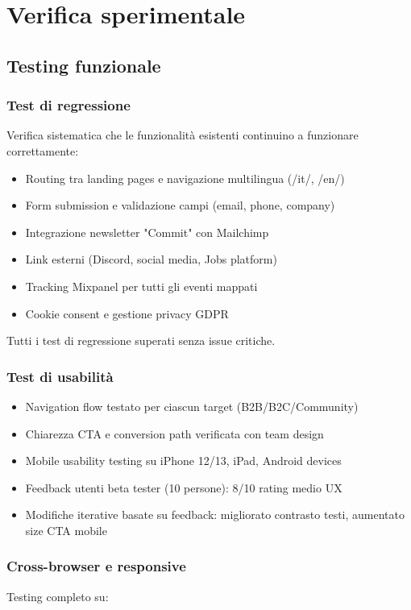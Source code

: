 \chapter{Verifica sperimentale}

\section{Testing funzionale}
\subsection{Test di regressione}
Verifica sistematica che le funzionalità esistenti continuino a 
funzionare correttamente:

\begin{itemize}
  \item Routing tra landing pages e navigazione multilingua (/it/, /en/)
  \item Form submission e validazione campi (email, phone, company)
  \item Integrazione newsletter "Commit" con Mailchimp
  \item Link esterni (Discord, social media, Jobs platform)
  \item Tracking Mixpanel per tutti gli eventi mappati
  \item Cookie consent e gestione privacy GDPR
\end{itemize}

Tutti i test di regressione superati senza issue critiche.

\subsection{Test di usabilità}
\begin{itemize}
  \item Navigation flow testato per ciascun target (B2B/B2C/Community)
  \item Chiarezza CTA e conversion path verificata con team design
  \item Mobile usability testing su iPhone 12/13, iPad, Android devices
  \item Feedback utenti beta tester (10 persone): 8/10 rating medio UX
  \item Modifiche iterative basate su feedback: migliorato contrasto 
        testi, aumentato size CTA mobile
\end{itemize}

\subsection{Cross-browser e responsive}
Testing completo su:

